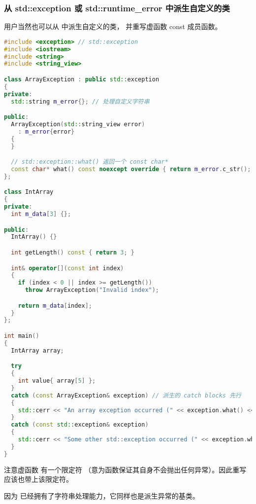 \documentclass[../../LearnCpp.tex]{subfiles}
\begin{document}
\subsubsection*{从 std::exception 或 std::runtime\_error 中派生自定义的类}

用户当然也可以从  中派生自定义的类，
并重写虚函数  const 成员函数。

\begin{lstlisting}[language=C++]
#include <exception> // std::exception
#include <iostream>
#include <string>
#include <string_view>

class ArrayException : public std::exception
{
private:
  std::string m_error{}; // 处理自定义字符串

public:
  ArrayException(std::string_view error)
    : m_error{error}
  {
  }

  // std::exception::what() 返回一个 const char*
  const char* what() const noexcept override { return m_error.c_str(); }
};

class IntArray
{
private:
  int m_data[3] {};

public:
  IntArray() {}

  int getLength() const { return 3; }

  int& operator[](const int index)
  {
    if (index < 0 || index >= getLength())
      throw ArrayException("Invalid index");

    return m_data[index];
  }
};

int main()
{
  IntArray array;

  try
  {
    int value{ array[5] };
  }
  catch (const ArrayException& exception) // 派生的 catch blocks 先行
  {
    std::cerr << "An array exception occurred (" << exception.what() << ")\n";
  }
  catch (const std::exception& exception)
  {
    std::cerr << "Some other std::exception occurred (" << exception.what() << ")\n";
  }
}
\end{lstlisting}

注意虚函数  有一个限定符 
（意为函数保证其自身不会抛出任何异常）。因此重写应该也带上该限定符。

因为  已经拥有了字符串处理能力，它同样也是派生异常的基类。
\end{document}
